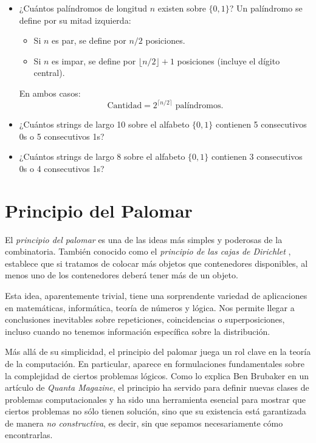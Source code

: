 \begin{itemize}
    \item ¿Cuántos palíndromos de longitud $n$ existen sobre $\{0,1\}$?
    \ifshowsolutions
    Un palíndromo se define por su mitad izquierda:
    \begin{itemize}
        \item Si $n$ es par, se define por $n/2$ posiciones.
        \item Si $n$ es impar, se define por $\lfloor n/2 \rfloor + 1$ posiciones (incluye el dígito central).
    \end{itemize}
    En ambos casos:
    \[\text{Cantidad} = 2^{\lceil n/2 \rceil}\text{ palíndromos.}\]
    \fi

    
    \item  ¿Cuántos strings de largo 10 sobre el alfabeto
$\{0,1\}$ contienen 5 consecutivos 0s o 5 consecutivos 1s?
    \item ¿Cuántos strings de largo 8 sobre el alfabeto $\{0,1\}$
contienen 3 consecutivos 0s o 4 consecutivos 1s? 

\end{itemize}


\section{Principio del Palomar}

El \emph{principio del palomar} es una de las ideas más simples y poderosas de la combinatoria. También conocido como el \textit{principio de las cajas de Dirichlet }, establece que si tratamos de colocar más objetos que contenedores disponibles, al menos uno de los contenedores deberá tener más de un objeto. 

Esta idea, aparentemente trivial, tiene una sorprendente variedad de aplicaciones en matemáticas, informática, teoría de números y lógica. Nos permite llegar a conclusiones inevitables sobre repeticiones, coincidencias o superposiciones, incluso cuando no tenemos información específica sobre la distribución.

Más allá de su simplicidad, el principio del palomar juega un rol clave en la teoría de la computación. En particular, aparece en formulaciones fundamentales sobre la complejidad de ciertos problemas lógicos. Como lo explica Ben Brubaker en un artículo de \textit{Quanta Magazine}, el principio ha servido para definir nuevas clases de problemas computacionales y ha sido una herramienta esencial para mostrar que ciertos problemas no sólo tienen solución, sino que su existencia está garantizada de manera \textit{no constructiva}, es decir, sin que sepamos necesariamente cómo encontrarlas.


